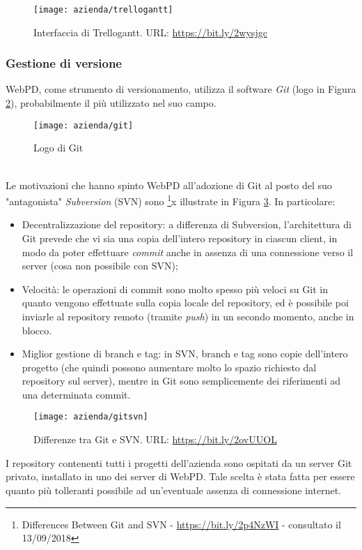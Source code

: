 \begin{figure}[!h] 
	\centering 
	\texttt{[image: azienda/trellogantt]} 
	\caption{Interfaccia di Trellogantt. URL: \url{https://bit.ly/2wysjgc} }
	\label{figura:trellogantt}
\end{figure}


\subsubsection{Gestione di versione}
WebPD, come strumento di versionamento, utilizza il software \textit{Git} (logo in Figura \ref{figura:logo-git}), probabilmente il più utilizzato nel suo campo.\\
\begin{figure}[!h] 
	\centering 
	\texttt{[image: azienda/git]} 
	\caption{Logo di Git }
	\label{figura:logo-git}
\end{figure}\\
 Le motivazioni che hanno spinto WebPD all'adozione di Git al posto del suo "antagonista" \textit{Subversion} (SVN) sono  \footnote{Differences Between Git and SVN - \url{https://bit.ly/2p4NzWI} - consultato il 13/09/2018}x illustrate in Figura \ref{figura:differenze-git-svn}. In particolare:
\begin{itemize}
	\item Decentralizzazione del repository: a differenza di Subversion, l'architettura di Git prevede che vi sia una copia dell'intero repository in ciascun client, in modo da poter effettuare \textit{commit} anche in assenza di una connessione verso il server (cosa non possibile con SVN);
	\item Velocità: le operazioni di commit sono molto spesso più veloci su Git in quanto vengono effettuate sulla copia locale del repository, ed è possibile poi inviarle al repository remoto (tramite \textit{push}) in un secondo momento, anche in blocco.
	\item Miglior gestione di branch e tag: in SVN, branch e tag sono copie dell'intero progetto (che quindi possono aumentare molto lo spazio richiesto dal repository sul server), mentre in Git sono semplicemente dei riferimenti ad una determinata commit.
\end{itemize}
\begin{figure}[!h] 
	\centering 
	\texttt{[image: azienda/gitsvn]} 
	\caption{Differenze tra Git e SVN. URL: \url{https://bit.ly/2ovUUOL} }
	\label{figura:differenze-git-svn}
\end{figure}
I repository contenenti tutti i progetti dell'azienda sono ospitati da un server Git privato, installato in uno dei server di WebPD. Tale scelta è stata fatta per essere quanto più tolleranti possibile ad un'eventuale assenza di connessione internet.

